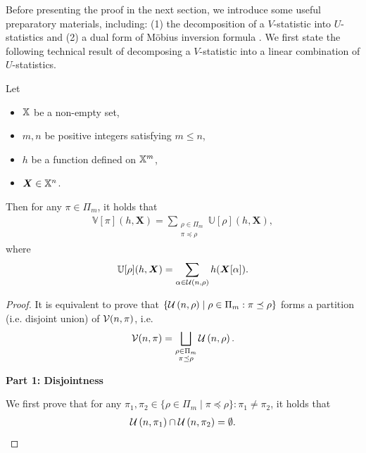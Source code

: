 \documentclass[letterpaper,11pt]{article}
\newcommand{\mobius}{M\"obius}
\newcommand{\sPi}{\pi}
\newcommand{\uset}{\calU}
\newcommand{\usetnm}[2]{\uset\left(#1,#2\right)}
\newcommand{\vset}{\calV}
\newcommand{\vsetp}[2]{\vset(#1,#2)}
\newcommand{\ustat}{\mathbb{U}}
\newcommand{\vstat}{\mathbb{V}}
\newcommand{\samplespace}{\bbX}
\newcommand{\partition}{\Pi}
\newcommand{\partitionp}[1]{\partition_{#1}}
\newcommand{\pleq}{\preceq}
\begin{document}
\begin{bibunit}[plainnat]
Before presenting the proof in the next section, we introduce some useful preparatory materials, including: (1) the decomposition of a $V$-statistic into $U$-statistics and (2) a dual form of \mobius{} inversion formula \citep{stanley2011enumerative}. We first state the following technical result of decomposing a $V$-statistic into a linear combination of $U$-statistics. 
\begin{lemma}
\label{lem:decomp_v_to_u}
    Let
    \begin{itemize}
        \item $\samplespace$ be a non-empty set, 
        \item $m,n$ be positive integers satisfying $m \leq n$, 
        \item $h$ be a function defined on ${\mathbb{X}}^m$, 
        \item $\bm{X} \in \samplespace^n$. 
    \end{itemize}
    Then for any $\sPi \in \partitionp{m}$, it holds that
    \begin{align*}
        \vstat[\sPi](h, \bm{X}) = \sum_{\substack{
            \rho \in \partitionp{m} \\ \sPi \pleq \rho
        }} \ustat[\rho](h,\bm{X}),
    \end{align*}
    where
     \begin{align*}
       \ustat[\rho](h,\bm{X}) = \sum_{\alpha \in \usetnm{n}{\rho}} h(\bm{X}[\alpha]). 
    \end{align*}
\end{lemma}

\begin{proof}
It is equivalent to prove that $\{\usetnm{n}{\rho} \mid \rho \in \partitionp{m}: \sPi \pleq \rho\}$ forms a partition (i.e. disjoint union) of $\vsetp{n}{\sPi}$, i.e.
\begin{align*}
\vsetp{n}{\sPi} = \bigsqcup_{\substack{\rho \in \partitionp{m} \\ \sPi \pleq \rho} }\usetnm{n}{\rho}.
\end{align*}

    {\bf Part 1: Disjointness}
    
    We first prove that for any $\pi_1, \pi_2 \in \{\rho \in \partitionp{m} \mid \sPi \pleq \rho \}: \pi_1 \neq \pi_2$, it holds that
    \begin{align*}
        \usetnm{n}{\pi_1} \cap \usetnm{n}{\pi_2} = \emptyset. 
    \end{align*}


\end{proof}
\end{bibunit}
\end{document}
